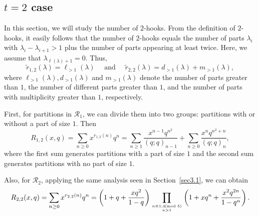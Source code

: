 \documentclass[11pt,reqno]{amsart}
\theoremstyle{remark}
\numberwithin{equation}{section}
\begin{document}
\subsection{$t=2$ case}\label{sec3.2}
In this section, we will study the number of $2$-hooks. From the definition of $2$-hooks, it easily follows that the number of $2$-hooks equals the number of parts $\lambda_i$ with $\lambda_i-\lambda_{i+1}>1$ plus the number of parts appearing at least twice. Here, we assume that $\lambda_{\ell(\lambda)+1}=0$. Thus, %
\begin{equation*}
\widetilde{r}_{1,2}(\lambda)=\ell_{>1}(\lambda) \quad \text{ and } \quad \widetilde{r}_{2,2}(\lambda)=d_{>1}(\lambda) + m_{>1} (\lambda),
\end{equation*}    
where $\ell_{>1}(\lambda), d_{>1}(\lambda)$ and $m_{>1}(\lambda)$ denote the number of parts greater than $1$, the number of different parts greater than $1$, and the number of parts with multiplicity greater than $1$, respectively. 

First, for partitions in $\mathcal{R}_1$, we can divide them into two groups: partitions with or without a part of size $1$. Then
\[
	R_{1,2}(x,q)=\sum_{n\ge 0} x^{r_{1,2}(n)} q^{n} = \sum_{n\ge 1} \frac{ x^{n-1} q^{n^2}}{(q;q)_{n-1}} +\sum_{n\ge 0} \frac{ x^n q^{n^2+n}}{(q;q)_n},
\]
where the first sum generates partitions with a part of size $1$ and the second sum generates partitions with no part of size $1$. 

Also, for $\mathcal{R}_2$, applying the same analysis seen in Section~\ref{sec3.1}, we can obtain
\[
	R_{2,2}(x,q)=\sum_{n\ge 0} x^{r_{2,2}(n)} q^{n} = \left(1+q+ \frac{xq^2}{1-q} \right)  \prod_{n\equiv 1,4 \!\!\!\pmod{5} \atop n>1 } \left( 1+ xq^n + \frac{x^2 q^{2n}}{1-q^n} \right).
\]
\end{document}
